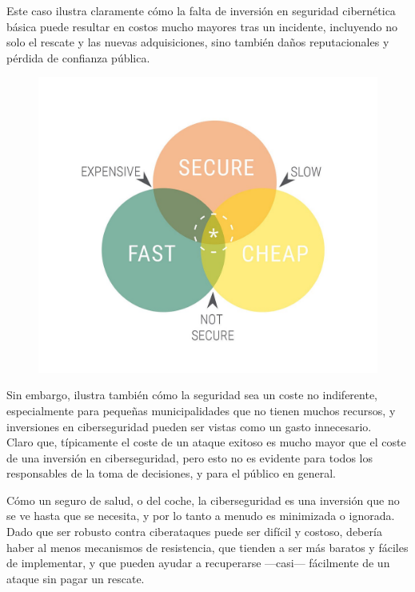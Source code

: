 Este caso ilustra claramente cómo la falta de inversión en seguridad cibernética básica puede resultar en costos mucho mayores tras un incidente, incluyendo no solo el rescate y las nuevas adquisiciones, sino también daños reputacionales y pérdida de confianza pública.

\begin{paracol}{2}
    

    \colfill
    \begin{figure}[htbp]
        \centering
        \includegraphics[width=0.95\columnwidth]{images/FSC.jpg}
        \label{fig:FSC}
    \end{figure}
    \colfill
    
    \switchcolumn
    Sin embargo, ilustra también cómo la seguridad sea un coste no indiferente, especialmente para pequeñas municipalidades que no tienen muchos recursos, y inversiones en ciberseguridad pueden ser vistas como un gasto innecesario.\\
    Claro que, típicamente el coste de un ataque exitoso es mucho mayor que el coste de una inversión en ciberseguridad, pero esto no es evidente para todos los responsables de la toma de decisiones, y para el público en general.
    
    Cómo un seguro de salud, o del coche, la ciberseguridad es una inversión que no se ve hasta que se necesita, y por lo tanto a menudo es minimizada o ignorada.\\
    Dado que ser robusto contra ciberataques puede ser difícil y costoso, debería haber al menos mecanismos de resistencia, que tienden a ser más baratos y fáciles de implementar, y que pueden ayudar a recuperarse ---casi--- fácilmente de un ataque sin pagar un rescate.
    
\end{paracol}


